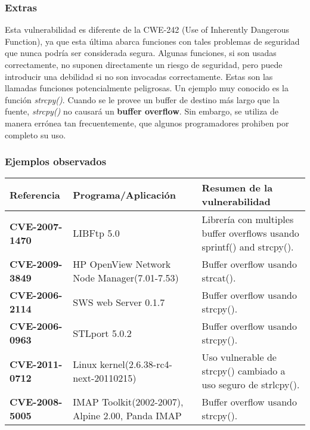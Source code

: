 \subsubsection{Extras}

Esta vulnerabilidad es diferente de la CWE-242 (Use of Inherently Dangerous Function), ya que esta última abarca funciones con tales problemas de seguridad que nunca podría ser
considerada segura. Algunas funciones, si son usadas correctamente, no suponen directamente un riesgo de seguridad, pero puede introducir una debilidad si no son
invocadas correctamente. Estas son las llamadas funciones potencialmente peligrosas. Un ejemplo muy conocido es la función \textit{strcpy()}. Cuando se le provee un buffer
de destino más largo que la fuente, \textit{strcpy()} no causará un \textbf{buffer overflow}. Sin embargo, se utiliza de manera errónea tan frecuentemente, que algunos programadores
prohiben por completo su uso.

\subsubsection{Ejemplos observados}

\begin{tabular}[\baselineskip]{|p{1.75cm}|p{4.75cm}|p{6.5cm}|}
  \hline
  \textbf{Referencia} & Programa/Aplicación & Resumen de la vulnerabilidad \\
  \hline
  \textbf{CVE-2007-1470} & LIBFtp 5.0 & Librería con multiples buffer overflows usando sprintf() and strcpy().\\
  \hline
  \textbf{CVE-2009-3849} & HP OpenView Network Node Manager(7.01-7.53) & Buffer overflow usando strcat(). \\
  \hline
  \textbf{CVE-2006-2114} & SWS web Server 0.1.7  & Buffer overflow usando strcpy(). \\
  \hline
  \textbf{CVE-2006-0963} & STLport 5.0.2  & Buffer overflow usando strcpy(). \\
  \hline
  \textbf{CVE-2011-0712} & Linux kernel(2.6.38-rc4-next-20110215) & Uso vulnerable de strcpy() cambiado a uso seguro de strlcpy().\\
  \hline
  \textbf{CVE-2008-5005} & IMAP Toolkit(2002-2007), Alpine 2.00, Panda IMAP & Buffer overflow usando strcpy(). \\
  \hline
\end{tabular}
